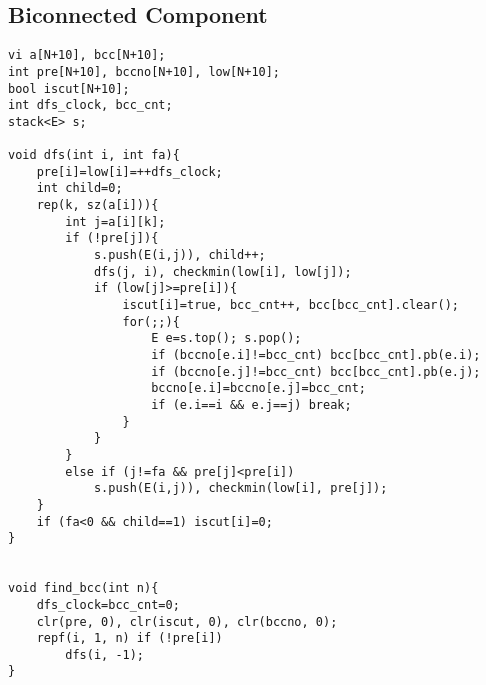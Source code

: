 \subsection{Biconnected Component}
\begin{lstlisting}
vi a[N+10], bcc[N+10];
int pre[N+10], bccno[N+10], low[N+10];
bool iscut[N+10];
int dfs_clock, bcc_cnt;
stack<E> s;

void dfs(int i, int fa){
    pre[i]=low[i]=++dfs_clock;
    int child=0;
    rep(k, sz(a[i])){
        int j=a[i][k];
        if (!pre[j]){
            s.push(E(i,j)), child++;
            dfs(j, i), checkmin(low[i], low[j]);
            if (low[j]>=pre[i]){
                iscut[i]=true, bcc_cnt++, bcc[bcc_cnt].clear();
                for(;;){
                    E e=s.top(); s.pop();
                    if (bccno[e.i]!=bcc_cnt) bcc[bcc_cnt].pb(e.i);
                    if (bccno[e.j]!=bcc_cnt) bcc[bcc_cnt].pb(e.j);
                    bccno[e.i]=bccno[e.j]=bcc_cnt;
                    if (e.i==i && e.j==j) break;
                }
            }
        }
        else if (j!=fa && pre[j]<pre[i])
            s.push(E(i,j)), checkmin(low[i], pre[j]);
    }
    if (fa<0 && child==1) iscut[i]=0;
}


void find_bcc(int n){
    dfs_clock=bcc_cnt=0;
    clr(pre, 0), clr(iscut, 0), clr(bccno, 0);
	repf(i, 1, n) if (!pre[i])
    	dfs(i, -1);
}

\end{lstlisting}
